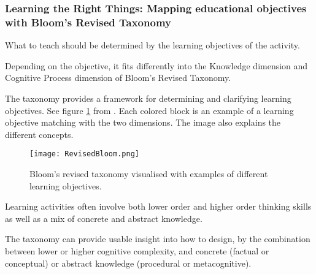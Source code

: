 


%


  \subsubsection{Learning the Right Things: Mapping educational objectives with Bloom's Revised Taxonomy}

  What to teach should be determined by the learning objectives of the activity.

  Depending on the objective, it fits differently into the Knowledge dimension and Cognitive Process dimension of Bloom's Revised Taxonomy. \cite{bloom}

  The taxonomy provides a framework for determining and clarifying learning objectives. See figure \ref{fig:revised-bloom} from \cite{heer}. Each colored block is an example of a learning objective matching with the two dimensions. The image also explains the different concepts.

  \begin{figure}[h]
    \centering
    \texttt{[image: RevisedBloom.png]}
    \caption{Bloom's revised taxonomy visualised with examples of different learning objectives.}
    \label{fig:revised-bloom}
\end{figure}

  Learning activities often involve both lower order and higher order thinking skills as well as a mix of concrete and abstract knowledge.

  The taxonomy can provide usable insight into how to design, by the combination between lower or higher cognitive complexity, and concrete (factual or conceptual) or abstract knowledge (procedural or metacognitive). \cite{cheong}

